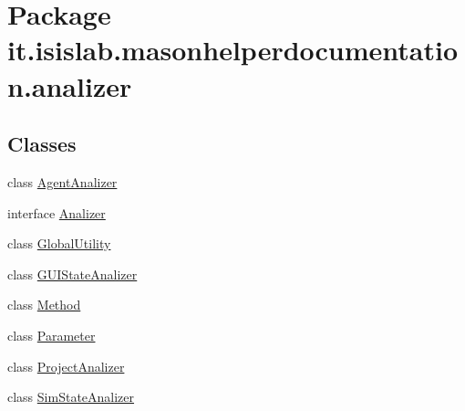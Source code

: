\hypertarget{namespaceit_1_1isislab_1_1masonhelperdocumentation_1_1analizer}{\section{Package it.\-isislab.\-masonhelperdocumentation.\-analizer}
\label{namespaceit_1_1isislab_1_1masonhelperdocumentation_1_1analizer}
}
\subsection*{Classes}
\begin{DoxyCompactItemize}
\item 
class \hyperlink{classit_1_1isislab_1_1masonhelperdocumentation_1_1analizer_1_1_agent_analizer}{Agent\-Analizer}
\item 
interface \hyperlink{interfaceit_1_1isislab_1_1masonhelperdocumentation_1_1analizer_1_1_analizer}{Analizer}
\item 
class \hyperlink{classit_1_1isislab_1_1masonhelperdocumentation_1_1analizer_1_1_global_utility}{Global\-Utility}
\item 
class \hyperlink{classit_1_1isislab_1_1masonhelperdocumentation_1_1analizer_1_1_g_u_i_state_analizer}{G\-U\-I\-State\-Analizer}
\item 
class \hyperlink{classit_1_1isislab_1_1masonhelperdocumentation_1_1analizer_1_1_method}{Method}
\item 
class \hyperlink{classit_1_1isislab_1_1masonhelperdocumentation_1_1analizer_1_1_parameter}{Parameter}
\item 
class \hyperlink{classit_1_1isislab_1_1masonhelperdocumentation_1_1analizer_1_1_project_analizer}{Project\-Analizer}
\item 
class \hyperlink{classit_1_1isislab_1_1masonhelperdocumentation_1_1analizer_1_1_sim_state_analizer}{Sim\-State\-Analizer}
\end{DoxyCompactItemize}
